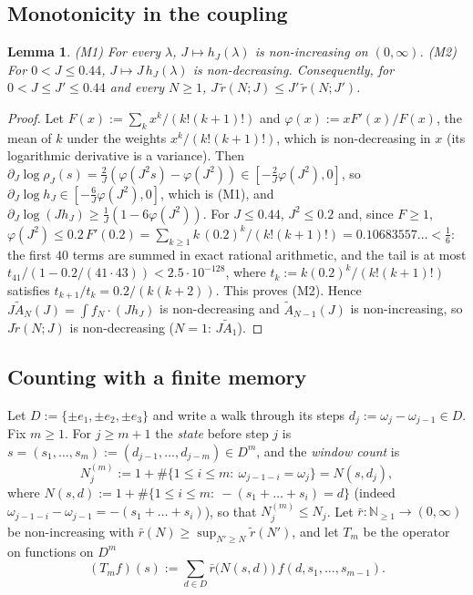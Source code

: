 \documentclass[11pt,a4paper]{article}
\theoremstyle{plain}
\newtheorem{lemma}[theorem]{Lemma}
\theoremstyle{remark}
\numberwithin{equation}{section}
\newcommand{\N}{\mathbb{N}}
\newcommand{\At}{\widetilde A}
\newcommand{\rt}{\widetilde r}
\newcommand{\rb}{\bar r}
\begin{document}
\subsection{Monotonicity in the coupling}
\begin{lemma}\label{lem:monotone}
(M1) For every $\lambda$, $J\mapsto h_J(\lambda)$ is non-increasing on $(0,\infty)$. (M2) For $0<J\le0.44$, $J\mapsto J\,h_J(\lambda)$
is non-decreasing. Consequently, for $0<J\le J'\le0.44$ and every $N\ge1$, $J\,\rt(N;J)\le J'\,\rt(N;J')$.
\end{lemma}
\begin{proof}
Let $F(x):=\sum_kx^k/(k!(k+1)!)$ and $\varphi(x):=xF'(x)/F(x)$, the mean of $k$ under the weights $x^k/(k!(k+1)!)$, which is
non-decreasing in $x$ (its logarithmic derivative is a variance). Then $\partial_J\log\rho_J(s)=\frac2J(\varphi(J^2s)-\varphi(J^2))\in
[-\frac2J\varphi(J^2),0]$, so $\partial_J\log h_J\in[-\frac6J\varphi(J^2),0]$, which is (M1), and $\partial_J\log(Jh_J)\ge\frac1J
(1-6\varphi(J^2))$. For $J\le0.44$, $J^2\le0.2$ and, since $F\ge1$,
$\varphi(J^2)\le0.2\,F'(0.2)=\sum_{k\ge1}k\,(0.2)^k/(k!(k+1)!)=0.10683557\ldots<\frac16$: the first $40$ terms are summed in exact
rational arithmetic, and the tail is at most $t_{41}/(1-0.2/(41\cdot43))<2.5\cdot10^{-128}$, where $t_k:=k(0.2)^k/(k!(k+1)!)$ satisfies
$t_{k+1}/t_k=0.2/(k(k+2))$. This proves (M2). Hence $J\At_N(J)=\int f_N\cdot(Jh_J)$ is non-decreasing and $\At_{N-1}(J)$ is
non-increasing, so $J\rt(N;J)$ is non-decreasing ($N=1$: $J\At_1$).
\end{proof}

\subsection{Counting with a finite memory}
Let $D:=\{\pm e_1,\pm e_2,\pm e_3\}$ and write a walk through its steps $d_j:=\omega_j-\omega_{j-1}\in D$. Fix $m\ge1$. For $j\ge m+1$
the \emph{state} before step $j$ is $s=(s_1,\dots,s_m):=(d_{j-1},\dots,d_{j-m})\in D^m$, and the \emph{window count} is
\[
N_j^{(m)}:=1+\#\{1\le i\le m:\ \omega_{j-1-i}=\omega_j\}=N(s,d_j),
\]
where $N(s,d):=1+\#\{1\le i\le m:\ -(s_1+\dots+s_i)=d\}$ (indeed $\omega_{j-1-i}-\omega_{j-1}=-(s_1+\dots+s_i)$),
so that $N_j^{(m)}\le N_j$. Let $\rb:\N_{\ge1}\to(0,\infty)$ be non-increasing with $\rb(N)\ge\sup_{N'\ge N}\rt(N')$, and let $T_m$ be
the operator on functions on $D^m$
\[
(T_mf)(s):=\sum_{d\in D}\rb\big(N(s,d)\big)\,f(d,s_1,\dots,s_{m-1}).
\]
\end{document}
